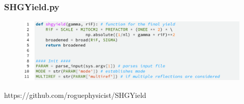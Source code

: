 \documentclass{beamer}
\begin{document}
\begin{frame}
\hypertarget{app-shgyield}{}
\frametitle{SHGYield.py}
\centering
\begin{figure}
\includegraphics[width=\textwidth]{code-shgyield}
\end{figure}
https://github.com/roguephysicist/SHGYield
\end{frame}
\end{document}
